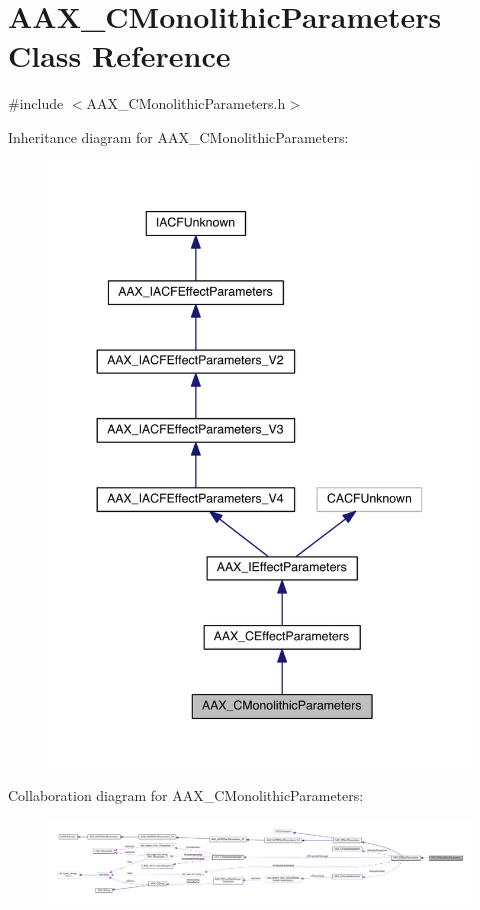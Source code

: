 \hypertarget{a00026}{}\section{A\+A\+X\+\_\+\+C\+Monolithic\+Parameters Class Reference}
\label{a00026}


{\ttfamily \#include $<$A\+A\+X\+\_\+\+C\+Monolithic\+Parameters.\+h$>$}



Inheritance diagram for A\+A\+X\+\_\+\+C\+Monolithic\+Parameters\+:
\nopagebreak
\begin{figure}[H]
\begin{center}
\leavevmode
\includegraphics[width=344pt]{a00434}
\end{center}
\end{figure}


Collaboration diagram for A\+A\+X\+\_\+\+C\+Monolithic\+Parameters\+:
\nopagebreak
\begin{figure}[H]
\begin{center}
\leavevmode
\includegraphics[width=350pt]{a00435}
\end{center}
\end{figure}


